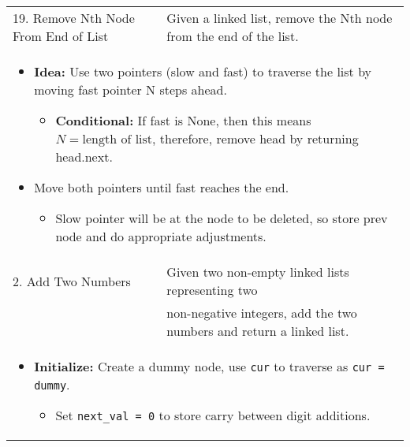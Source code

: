 \begin{summary}
\begin{center}
\begin{tabular}{ll}
                \midrule 
                19. Remove Nth Node From End of List & Given a linked list, remove the Nth node from the end of the list. \\
                \multicolumn{2}{p{\linewidth}}{
                    \begin{itemize}
                        \item \textbf{Idea:} Use two pointers (slow and fast) to traverse the list by moving fast pointer N steps ahead. 
                        \begin{itemize}
                            \item \textbf{Conditional:} If fast is None, then this means $N=\text{length of list}$, therefore, remove head by returning head.next.
                        \end{itemize}
                        \item Move both pointers until fast reaches the end. 
                        \begin{itemize}
                            \item Slow pointer will be at the node to be deleted, so store prev node and do appropriate adjustments. 
                        \end{itemize}
                    \end{itemize}
                } \\
                \midrule
                2. Add Two Numbers & Given two non-empty linked lists representing two \\
                & non-negative integers, add the two numbers and return a linked list. \\
                \multicolumn{2}{p{\linewidth}}{
                    \begin{itemize}
                        \item \textbf{Initialize:} Create a dummy node, use \texttt{cur} to traverse as \texttt{cur = dummy}.
                        \begin{itemize}
                            \item Set \texttt{next\_val = 0} to store carry between digit additions.
                        \end{itemize}

\end{itemize}}
\end{tabular}
\end{center}
\end{summary}
